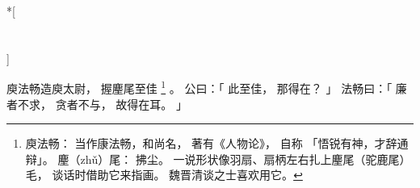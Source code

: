 
\switchcolumn[0]*[\section{}]

庾法畅造庾太尉，
握麈尾至佳%
\footnote{%
    庾法畅：
        当作康法畅，和尚名，
        著有《人物论》，
        自称
        「悟锐有神，才辞通辩」。
    麈（zhǔ）尾：
        拂尘。
        一说形状像羽扇、扇柄左右扎上麈尾（驼鹿尾）毛，
        谈话时借助它来指画。
        魏晋清谈之士喜欢用它。
}%
。
公曰：「
    此至佳，
    那得在？
」
法畅曰：「
    廉者不求，
    贪者不与，
    故得在耳。
」

\switchcolumn


